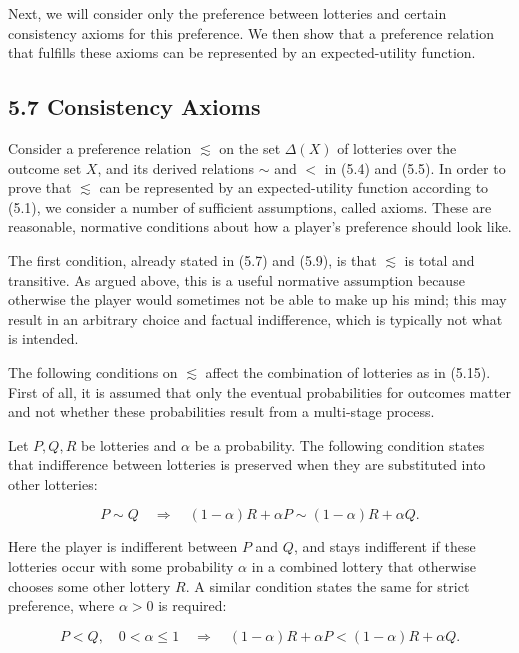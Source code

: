 \documentclass[12pt]{article}
\begin{document}
Next, we will consider only the preference between lotteries and certain consistency axioms for this preference. We then show that a preference relation that fulfills these axioms can be represented by an expected-utility function.

\subsection*{5.7 Consistency Axioms}
Consider a preference relation $\lesssim$ on the set $\Delta(X)$ of lotteries over the outcome set $X$, and its derived relations $\sim$ and $<$ in (5.4) and (5.5). In order to prove that $\lesssim$ can be represented by an expected-utility function according to (5.1), we consider a number of sufficient assumptions, called axioms. These are reasonable, normative conditions about how a player's preference should look like.

The first condition, already stated in (5.7) and (5.9), is that $\lesssim$ is total and transitive. As argued above, this is a useful normative assumption because otherwise the player would sometimes not be able to make up his mind; this may result in an arbitrary choice and factual indifference, which is typically not what is intended.

The following conditions on $\lesssim$ affect the combination of lotteries as in (5.15). First of all, it is assumed that only the eventual probabilities for outcomes matter and not whether these probabilities result from a multi-stage process.

Let $P, Q, R$ be lotteries and $\alpha$ be a probability. The following condition states that indifference between lotteries is preserved when they are substituted into other lotteries:


\begin{equation*}
P \sim Q \quad \Rightarrow \quad(1-\alpha) R+\alpha P \sim(1-\alpha) R+\alpha Q . \tag{5.26}
\end{equation*}


Here the player is indifferent between $P$ and $Q$, and stays indifferent if these lotteries occur with some probability $\alpha$ in a combined lottery that otherwise chooses some other lottery $R$. A similar condition states the same for strict preference, where $\alpha>0$ is required:


\begin{equation*}
P<Q, \quad 0<\alpha \leq 1 \quad \Rightarrow \quad(1-\alpha) R+\alpha P<(1-\alpha) R+\alpha Q . \tag{5.27}
\end{equation*}
\end{document}
